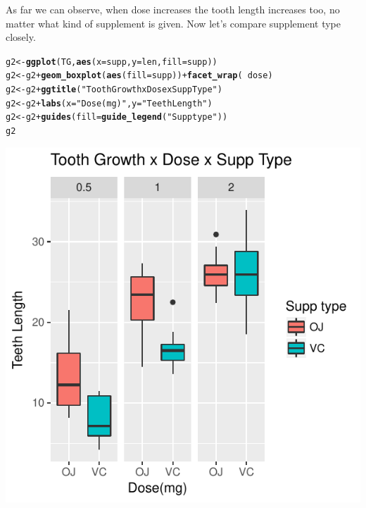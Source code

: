 \documentclass[a4paper, 12pt]{article}\usepackage[]{graphicx}\usepackage[]{color}
\makeatletter
\def\maxwidth{ %
  \ifdim\Gin@nat@width>\linewidth
    \linewidth
  \else
    \Gin@nat@width
  \fi
}
\newcommand{\hlstr}[1]{\textcolor[rgb]{0.192,0.494,0.8}{#1}}%
\newcommand{\hlopt}[1]{\textcolor[rgb]{0,0,0}{#1}}%
\newcommand{\hlstd}[1]{\textcolor[rgb]{0.345,0.345,0.345}{#1}}%
\newcommand{\hlkwb}[1]{\textcolor[rgb]{0.69,0.353,0.396}{#1}}%
\newcommand{\hlkwc}[1]{\textcolor[rgb]{0.333,0.667,0.333}{#1}}%
\newcommand{\hlkwd}[1]{\textcolor[rgb]{0.737,0.353,0.396}{\textbf{#1}}}%
\newenvironment{kframe}{%
 \def\at@end@of@kframe{}%
 \ifinner\ifhmode%
  \def\at@end@of@kframe{\end{minipage}}%
  \begin{minipage}{\columnwidth}%
 \fi\fi%
 \def\FrameCommand##1{\hskip\@totalleftmargin \hskip-\fboxsep
 \colorbox{shadecolor}{##1}\hskip-\fboxsep
     \hskip-\linewidth \hskip-\@totalleftmargin \hskip\columnwidth}%
 \MakeFramed {\advance\hsize-\width
   \@totalleftmargin\z@ \linewidth\hsize
   \@setminipage}}%
 {\par\unskip\endMakeFramed%
 \at@end@of@kframe}
\newenvironment{knitrout}{}{} %
\makeatother
\begin{document}
As far we can observe, when dose increases the tooth length increases too, no matter what kind of supplement is given.  Now let's compare supplement type closely.
\begin{knitrout}\small
{}\color{fgcolor}\begin{kframe}
\begin{alltt}
\hlstd{g2} \hlkwb{<-} \hlkwd{ggplot}\hlstd{(TG,} \hlkwd{aes}\hlstd{(}\hlkwc{x}\hlstd{=supp,} \hlkwc{y}\hlstd{=len,} \hlkwc{fill}\hlstd{=supp))}
\hlstd{g2} \hlkwb{<-} \hlstd{g2} \hlopt{+} \hlkwd{geom_boxplot}\hlstd{(}\hlkwd{aes}\hlstd{(}\hlkwc{fill}\hlstd{=supp))} \hlopt{+} \hlkwd{facet_wrap}\hlstd{(}\hlopt{~} \hlstd{dose)}
\hlstd{g2} \hlkwb{<-} \hlstd{g2} \hlopt{+} \hlkwd{ggtitle}\hlstd{(}\hlstr{"Tooth Growth x Dose x Supp Type"}\hlstd{)}
\hlstd{g2} \hlkwb{<-} \hlstd{g2} \hlopt{+} \hlkwd{labs}\hlstd{(}\hlkwc{x} \hlstd{=} \hlstr{"Dose(mg)"}\hlstd{,} \hlkwc{y} \hlstd{=} \hlstr{"Teeth Length"}\hlstd{)}
\hlstd{g2} \hlkwb{<-} \hlstd{g2} \hlopt{+} \hlkwd{guides}\hlstd{(}\hlkwc{fill}\hlstd{=}\hlkwd{guide_legend}\hlstd{(}\hlstr{"Supp type"}\hlstd{))}
\hlstd{g2}
\end{alltt}
\end{kframe}

{\centering \includegraphics[width=\maxwidth]{figure/plot2-1} 

}



\end{knitrout}
\end{document}
